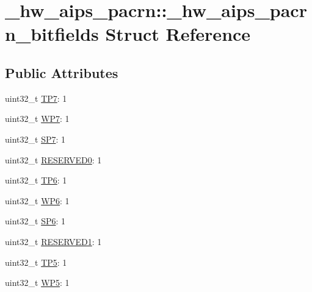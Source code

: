 \hypertarget{struct__hw__aips__pacrn_1_1__hw__aips__pacrn__bitfields}{}\section{\+\_\+hw\+\_\+aips\+\_\+pacrn\+:\+:\+\_\+hw\+\_\+aips\+\_\+pacrn\+\_\+bitfields Struct Reference}
\label{struct__hw__aips__pacrn_1_1__hw__aips__pacrn__bitfields}
\subsection*{Public Attributes}
\begin{DoxyCompactItemize}
\item 
uint32\+\_\+t \hyperlink{struct__hw__aips__pacrn_1_1__hw__aips__pacrn__bitfields_a9fe54541027958e1f61bd9c73708302d}{T\+P7}\+: 1
\item 
uint32\+\_\+t \hyperlink{struct__hw__aips__pacrn_1_1__hw__aips__pacrn__bitfields_a309ab30e651b2ff0a6048131a35600f9}{W\+P7}\+: 1
\item 
uint32\+\_\+t \hyperlink{struct__hw__aips__pacrn_1_1__hw__aips__pacrn__bitfields_a1607221d8cbc4c190ff819a0f3e89b76}{S\+P7}\+: 1
\item 
uint32\+\_\+t \hyperlink{struct__hw__aips__pacrn_1_1__hw__aips__pacrn__bitfields_a1390d725956b322b659a9340912b0498}{R\+E\+S\+E\+R\+V\+E\+D0}\+: 1
\item 
uint32\+\_\+t \hyperlink{struct__hw__aips__pacrn_1_1__hw__aips__pacrn__bitfields_ac1da1b8f9bd362ace9d02b8caf6ff4e4}{T\+P6}\+: 1
\item 
uint32\+\_\+t \hyperlink{struct__hw__aips__pacrn_1_1__hw__aips__pacrn__bitfields_a2c13f09f7fb3237457e59d35c25b074a}{W\+P6}\+: 1
\item 
uint32\+\_\+t \hyperlink{struct__hw__aips__pacrn_1_1__hw__aips__pacrn__bitfields_a32fbe8de24c2caaac065a233a51bff76}{S\+P6}\+: 1
\item 
uint32\+\_\+t \hyperlink{struct__hw__aips__pacrn_1_1__hw__aips__pacrn__bitfields_af42ab6421a58b0741cb07d2e3db7cab5}{R\+E\+S\+E\+R\+V\+E\+D1}\+: 1
\item 
uint32\+\_\+t \hyperlink{struct__hw__aips__pacrn_1_1__hw__aips__pacrn__bitfields_a3cef7c6f4cfc4f3208c48f188768ac02}{T\+P5}\+: 1
\item 
uint32\+\_\+t \hyperlink{struct__hw__aips__pacrn_1_1__hw__aips__pacrn__bitfields_ad8cd06b2d0a155e50507cbdbabee499f}{W\+P5}\+: 1

\end{DoxyCompactItemize}
